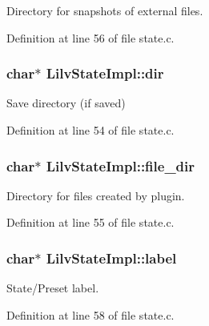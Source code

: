 Directory for snapshots of external files. 



Definition at line 56 of file state.\+c.

\subsubsection[{\texorpdfstring{dir}{dir}}]{\setlength{\rightskip}{0pt plus 5cm}char$\ast$ Lilv\+State\+Impl\+::dir}\hypertarget{struct_lilv_state_impl_a77d1235d86cbe387065c1f6b28e695ea}{}\label{struct_lilv_state_impl_a77d1235d86cbe387065c1f6b28e695ea}


Save directory (if saved) 



Definition at line 54 of file state.\+c.

\subsubsection[{\texorpdfstring{file\+\_\+dir}{file_dir}}]{\setlength{\rightskip}{0pt plus 5cm}char$\ast$ Lilv\+State\+Impl\+::file\+\_\+dir}\hypertarget{struct_lilv_state_impl_aca646616a6799ac3dd9d72fcf246cba3}{}\label{struct_lilv_state_impl_aca646616a6799ac3dd9d72fcf246cba3}


Directory for files created by plugin. 



Definition at line 55 of file state.\+c.

\subsubsection[{\texorpdfstring{label}{label}}]{\setlength{\rightskip}{0pt plus 5cm}char$\ast$ Lilv\+State\+Impl\+::label}\hypertarget{struct_lilv_state_impl_a34aa18d3cec23640abf47af7889aea44}{}\label{struct_lilv_state_impl_a34aa18d3cec23640abf47af7889aea44}


State/\+Preset label. 



Definition at line 58 of file state.\+c.

